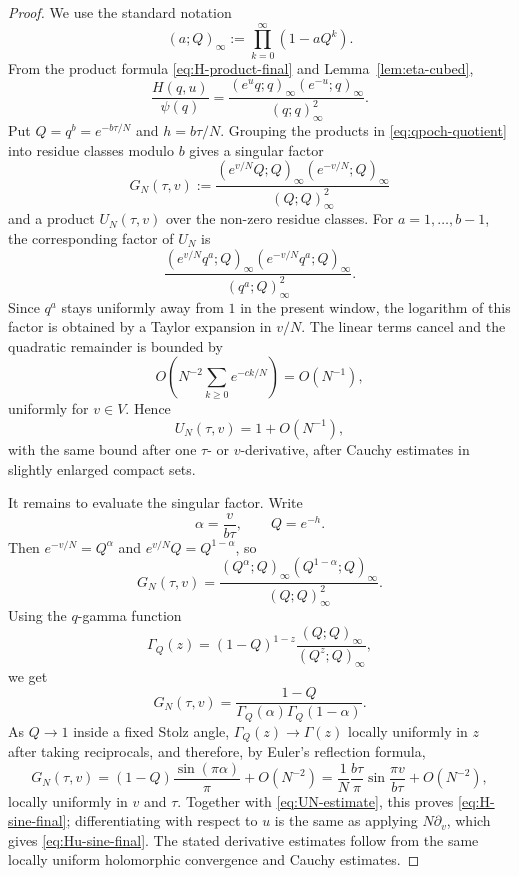\documentclass[11pt,a4paper,reqno]{amsart}
\theoremstyle{remark}
\newcommand{\qpoch}[2]{(#1;#2)_\infty}
\begin{document}
\begin{proof}
We use the standard notation
\[
        \qpoch{a}{Q}:=\prod_{k=0}^{\infty}(1-aQ^k).
\]
From the product formula \eqref{eq:H-product-final} and Lemma~\ref{lem:eta-cubed},
\begin{equation}\label{eq:qpoch-quotient}
        \frac{H(q,u)}{\psi(q)}=
        \frac{\qpoch{e^u q}{q}\qpoch{e^{-u}}{q}}{\qpoch{q}{q}^2}.
\end{equation}
Put $Q=q^b=e^{-b\tau/N}$ and $h=b\tau/N$.  Grouping the products in \eqref{eq:qpoch-quotient} into residue classes modulo $b$ gives a singular factor
\begin{equation}\label{eq:singular-factor}
        G_N(\tau,v):=
        \frac{\qpoch{e^{v/N}Q}{Q}\qpoch{e^{-v/N}}{Q}}{\qpoch{Q}{Q}^2}
\end{equation}
and a product $U_N(\tau,v)$ over the non-zero residue classes.  For $a=1,\ldots,b-1$, the corresponding factor of $U_N$ is
\[
        \frac{\qpoch{e^{v/N}q^a}{Q}\qpoch{e^{-v/N}q^a}{Q}}{\qpoch{q^a}{Q}^2}.
\]
Since $q^a$ stays uniformly away from $1$ in the present window, the logarithm of this factor is obtained by a Taylor expansion in $v/N$.  The linear terms cancel and the quadratic remainder is bounded by
\[
        O\left(N^{-2}\sum_{k\ge0}e^{-c k/N}\right)=O(N^{-1}),
\]
uniformly for $v\in V$.  Hence
\begin{equation}\label{eq:UN-estimate}
        U_N(\tau,v)=1+O(N^{-1}),
\end{equation}
with the same bound after one $\tau$- or $v$-derivative, after Cauchy estimates in slightly enlarged compact sets.

It remains to evaluate the singular factor.  Write
\[
        \alpha=\frac{v}{b\tau},
        \qquad Q=e^{-h}.
\]
Then $e^{-v/N}=Q^{\alpha}$ and $e^{v/N}Q=Q^{1-\alpha}$, so
\[
        G_N(\tau,v)=
        \frac{\qpoch{Q^\alpha}{Q}\qpoch{Q^{1-\alpha}}{Q}}{\qpoch{Q}{Q}^2}.
\]
Using the $q$-gamma function
\[
        \Gamma_Q(z)=(1-Q)^{1-z}\frac{\qpoch{Q}{Q}}{\qpoch{Q^z}{Q}},
\]
we get
\[
        G_N(\tau,v)=\frac{1-Q}{\Gamma_Q(\alpha)\Gamma_Q(1-\alpha)}.
\]
As $Q\to1$ inside a fixed Stolz angle, $\Gamma_Q(z)\to\Gamma(z)$ locally uniformly in $z$ after taking reciprocals, and therefore, by Euler's reflection formula,
\[
        G_N(\tau,v)=
        (1-Q)\frac{\sin(\pi\alpha)}{\pi}
        +O(N^{-2})
        =\frac1N\frac{b\tau}{\pi}\sin\frac{\pi v}{b\tau}
          +O(N^{-2}),
\]
locally uniformly in $v$ and $\tau$.  Together with \eqref{eq:UN-estimate}, this proves \eqref{eq:H-sine-final}; differentiating with respect to $u$ is the same as applying $N\partial_v$, which gives \eqref{eq:Hu-sine-final}.  The stated derivative estimates follow from the same locally uniform holomorphic convergence and Cauchy estimates.


\end{proof}
\end{document}
